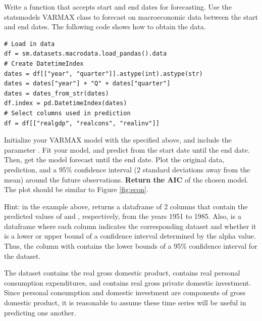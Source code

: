 \begin{problem}
\label{prob:arma:smvarma}

Write a function  that accepts start and end dates for forecasting.
Use the statsmodels VARMAX class to forecast on macroeconomic data between the start and end dates.
The following code shows how to obtain the data.

\begin{lstlisting}
# Load in data
df = sm.datasets.macrodata.load_pandas().data
# Create DatetimeIndex
dates = df[["year", "quarter"]].astype(int).astype(str)
dates = dates["year"] + "Q" + dates["quarter"]
dates = dates_from_str(dates)
df.index = pd.DatetimeIndex(dates)
# Select columns used in prediction
df = df[["realgdp", "realcons", "realinv"]]
\end{lstlisting}

Initialize your VARMAX model with the  specified above, and include the parameter .
Fit your model, and predict from the start date until the end date.
Then, get the model forecast until the end date.
Plot the original data, prediction, and a 95\% confidence interval (2 standard deviations away from the mean) around the future observations.
\textbf{Return the AIC} of the chosen model.
The plot should be similar to Figure \ref{fig:econ}.

\noindent Hint: in the example above,  returns a dataframe of 2 columns that contain the predicted values of  and , respectively, from the years 1951 to 1985.
Also,  is a dataframe where each column indicates the corresponding dataset and whether it is a lower or upper bound of a confidence interval determined by the alpha value.
Thus, the column  with  contains the lower bounds of a 95\% confidence interval for the  dataset.

The dataset  contains the real gross domestic product,  contains real personal consumption expenditures, and  contains real gross private domestic investment.
Since personal consumption and domestic investment are components of gross domestic product, it is reasonable to assume these time series will be useful in predicting one another.

\end{problem}

